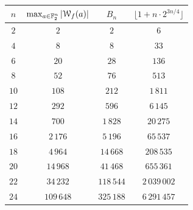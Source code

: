 \documentclass{llncs}
\begin{document}
\begin{table}[ht]
	\small
	\centering
	\begin{tabular}{|c|c|c|c|}
		\hline
		$n$ & $\max_{a\in\mathbb{F}_2^n}|\mathcal W_{f}(a)|$ & $B_n$  & $\lfloor 1+n \cdot 2^{3n/4} \rfloor$\\ \hline
		$2$  & $2$     & $2$  &  $6$ \\
		$4$  & $8$     & $8$  & $33$  \\
		$6$  & $20$    & $28$   & $136$\\
		$8$  & $52$    & $76$  & $513$ \\
		$10$ & $108$   & $212$  & $1\,811$\\
		$12$ & $292$   & $596$  & $6\,145$ \\
		$14$ & $700$   & $1\,828$ & $20\,275$ \\
		$16$ & $2\,176$  & $5\,196$ & $65\,537$ \\
		$18$ & $4\,964$  & $14\,668$ & $208\,535$ \\
		$20$ & $14\,968$ & $41\,468$ & $655\,361$ \\
		$22$ & $34\,232$ & $118\,544$ & $2\,039 \,002$ \\
		$24$ & $109\,648$ & $325\,188$ & $6\,291 \,457$  \\ \hline
	\end{tabular}
	\label{table:max_walsh_vs_bound}
\end{table}
\end{document}

